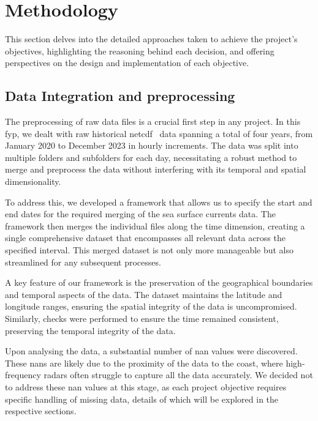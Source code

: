 \graphicspath{{content/chapters/3_methodology/methodology_figures}}

\chapter{Methodology}
\label{chp:methodology}

This section delves into the detailed approaches taken to achieve the project’s objectives, highlighting the reasoning behind each decision, and offering perspectives on the design and implementation of each objective.

\section{Data Integration and preprocessing}
\label{sec:3.1}

The preprocessing of raw data files is a crucial first step in any project. In this \acrshort{fyp}, we dealt with raw historical \acrshort{netcdf}~\cite{13} data spanning a total of four years, from January 2020 to December 2023 in hourly increments. The data was split into multiple folders and subfolders for each day, necessitating a robust method to merge and preprocess the data without interfering with its temporal and spatial dimensionality.

To address this, we developed a framework that allows us to specify the start and end dates for the required merging of the sea surface currents data. The framework then merges the individual files along the time dimension, creating a single comprehensive dataset that encompasses all relevant data across the specified interval. This merged dataset is not only more manageable but also streamlined for any subsequent processes.

A key feature of our framework is the preservation of the geographical boundaries and temporal aspects of the data. The dataset maintains the latitude and longitude ranges, ensuring the spatial integrity of the data is uncompromised. Similarly, checks were performed to ensure the time remained consistent, preserving the temporal integrity of the data.

Upon analysing the data, a substantial number of \acrshort{nan} values were discovered. These \acrshort{nan}s are likely due to the proximity of the data to the coast, where high-frequency radars  often struggle to capture all the data accurately. We decided not to address these \acrshort{nan} values at this stage, as each project objective requires specific handling of missing data, details of which will be explored in the respective sections.

